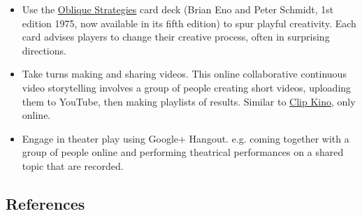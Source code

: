\begin{itemize}
\item
  Use the \href{http://www.rtqe.net/ObliqueStrategies/}{Oblique
  Strategies} card deck (Brian Eno and Peter Schmidt, 1st edition 1975,
  now available in its fifth edition) to spur playful creativity. Each
  card advises players to change their creative process, often in
  surprising directions.
\item
  Take turns making and sharing videos. This online collaborative
  continuous video storytelling involves a group of people creating
  short videos, uploading them to YouTube, then making playlists of
  results. Similar to \href{http://clipkino.info/}{Clip Kino}, only
  online.
\item
  Engage in theater play using Google+ Hangout. e.g. coming together
  with a group of people online and performing theatrical performances
  on a shared topic that are recorded.
\end{itemize}

\subsection{References}

